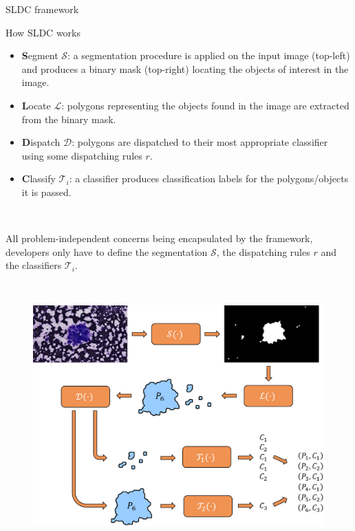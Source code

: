 \documentclass{beamer}
\begin{document}
\begin{frame}
\begin{columns}[t]
\begin{block} {SLDC framework}
\begin{alertblock}{How SLDC works}
~

\begin{itemize}
\item \textbf{S}egment $\mathcal{S}$: a segmentation procedure is applied on the input image (top-left) and produces a binary mask (top-right) locating the objects of interest in the image.
\item \textbf{L}ocate $\mathcal{L}$: polygons representing the objects found in the image are extracted from the binary mask.
\item \textbf{D}ispatch $\mathcal{D}$: polygons are dispatched to their most appropriate classifier using some dispatching rules $r$. 
\item \textbf{C}lassify $\mathcal{T}_i$: a classifier produces classification labels for the polygons/objects it is passed.
\end{itemize}

~

All problem-independent concerns being encapsulated by the framework, developers only have to define the segmentation $\mathcal{S}$, the dispatching rules $r$ and the classifiers $\mathcal{T}_i$.

~

\begin{figure}
\center
\includegraphics[scale=1.3]{images/workflow_illustration.png}
\end{figure}

\end{alertblock}
\end{block}

\column{.45\paperwidth}


\end{columns}
\end{frame}
\end{document}
